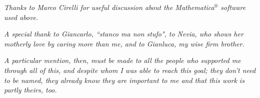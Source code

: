 \documentclass[a4paper,11pt]{article}
\begin{document}
\emph{Thanks to Marco Cirelli for useful discussion about the Mathematica$^{\circledR}$ software used above.}

\emph{A special thank to Giancarlo, ``stanco ma non stufo", to Nevia, who shows her motherly love by caring more than me, and to Gianluca, my wise firm brother.}

\emph{A particular mention, then, must be made to all the people who supported me through all of this, and despite whom I was able to reach this goal; they don't need to be named, they already know they are important to me and that this work is partly theirs, too.}
\end{document}
